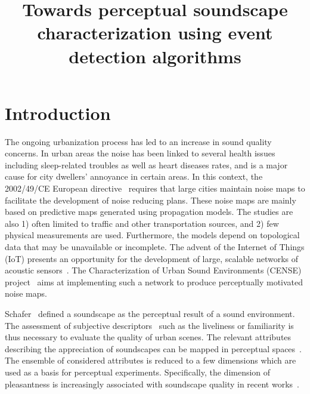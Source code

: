 \documentclass{article}
\title{Towards perceptual soundscape characterization using event detection algorithms}
\begin{document}
\ninept
\maketitle

\begin{sloppy}

\begin{abstract}

\end{abstract}

\begin{keywords}
\end{keywords}



\section{Introduction}
\label{sec:intro}

The ongoing urbanization process has led to an increase in sound quality concerns. In urban areas the noise has been linked to several health issues including sleep-related troubles as well as heart diseases rates, and is a major cause for city dwellers' annoyance in certain areas. In this context, the 2002/49/CE European directive~\cite{ec2002} requires that large cities maintain noise maps to facilitate the development of noise reducing plans. These noise maps are mainly based on predictive maps generated using propagation models. The studies are also 1) often limited to traffic and other transportation sources, and 2) few physical measurements are used. Furthermore, the models depend on topological data that may be unavailable or incomplete. The advent of the Internet of Things (IoT) presents an opportunity for the development of large, scalable networks of acoustic sensors~\cite{mydlarz2017, gontier2017}. The Characterization of Urban Sound Environments (CENSE) project~\cite{cense} aims at implementing such a network to produce perceptually motivated noise maps.

Schafer~\cite{schafer1977} defined a soundscape as the perceptual result of a sound environment. The assessment of subjective descriptors~\cite{berglund2006, brown2011, aletta2016} such as the liveliness or familiarity is thus necessary to evaluate the quality of urban scenes. The relevant attributes describing the appreciation of soundscapes can be mapped in perceptual spaces~\cite{axelsson2010, cain2013}. The ensemble of considered attributes is reduced to a few dimensions which are used as a basis for perceptual experiments. Specifically, the dimension of pleasantness is increasingly associated with soundscape quality in recent works~\cite{decoensel2006, delaitre2014, ricciardi2014, aumond2017}.


\end{sloppy}
\end{document}
